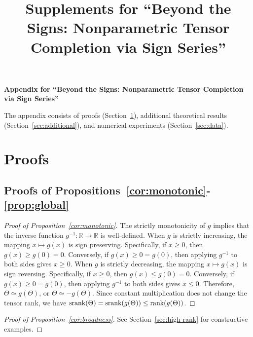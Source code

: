 \documentclass[11pt]{article}
\title{Supplements for ``Beyond the Signs: Nonparametric Tensor Completion via Sign Series''}
\theoremstyle{plain}
\theoremstyle{definition}
\def\srank{\textup{srank}}
\def\rank{\textup{rank}}
\begin{document}
\begin{center}
\begin{spacing}{1.5}
\textbf{\Large Appendix for ``Beyond the Signs: Nonparametric Tensor Completion via Sign Series''}
\end{spacing}
\end{center}

\appendix
The appendix consists of  proofs (Section~\ref{sec:proofs}), additional theoretical results (Section~\ref{sec:additional}),  and numerical experiments (Section~\ref{sec:data}).

\section{Proofs}\label{sec:proofs}
\subsection{Proofs of Propositions~\ref{cor:monotonic}-\ref{prop:global}}
\begin{proof}[Proof of Proposition~\ref{cor:monotonic}]
The strictly monotonicity of $g$ implies that the inverse function $g^{-1}\colon \mathbb{R}\to \mathbb{R}$ is well-defined. 
When $g$ is strictly increasing, the mapping $x\mapsto g(x)$ is sign preserving. Specifically, if $x\geq 0$, then $g(x)\geq g(0)=0$. Conversely, if $g(x)\geq 0=g(0)$, then applying $g^{-1}$ to both sides gives $x\geq 0$.
When $g$ is strictly decreasing, the mapping $x\mapsto g(x)$ is sign reversing. Specifically, if $x\geq 0$, then $g(x)\leq g(0)=0$. Conversely, if $g(x)\geq 0=g(0)$, then applying $g^{-1}$ to both sides gives $x\leq 0$.
 Therefore, $\Theta\simeq g(\Theta)$,  or $\Theta\simeq -g(\Theta)$. Since constant multiplication  does not change the tensor rank,  we have $\srank(\Theta)=\srank(g(\Theta))\leq \rank (g(\Theta))$. 
\end{proof}


\begin{proof}[Proof of Proposition~\ref{cor:broadness}]
See Section~\ref{sec:high-rank} for constructive examples.
\end{proof}
\end{document}
